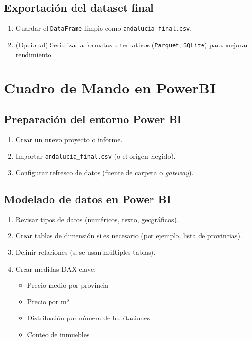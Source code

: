 \documentclass[a4paper,11pt]{book}
\begin{document}
\subsection{Exportación del dataset final}

\begin{enumerate}
    \item Guardar el \texttt{DataFrame} limpio como \texttt{andalucia\_final.csv}.
    \item (Opcional) Serializar a formatos alternativos (\texttt{Parquet}, \texttt{SQLite}) para mejorar rendimiento.
\end{enumerate}

\section{Cuadro de Mando en PowerBI}
\subsection{Preparación del entorno Power BI}

\begin{enumerate}
    \item Crear un nuevo proyecto o informe.
    \item Importar \texttt{andalucia\_final.csv} (o el origen elegido).
    \item Configurar refresco de datos (fuente de carpeta o \textit{gateway}).
\end{enumerate}

\subsection{Modelado de datos en Power BI}

\begin{enumerate}
    \item Revisar tipos de datos (numéricos, texto, geográficos).
    \item Crear tablas de dimensión si es necesario (por ejemplo, lista de provincias).
    \item Definir relaciones (si se usan múltiples tablas).
    \item Crear medidas DAX clave:
    \begin{itemize}
        \item Precio medio por provincia
        \item Precio por m²
        \item Distribución por número de habitaciones
        \item Conteo de inmuebles
    \end{itemize}
\end{enumerate}
\end{document}
